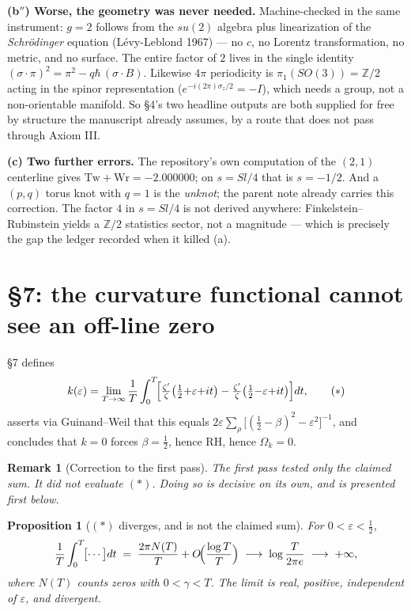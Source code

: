 \documentclass[11pt,a4paper]{article}
\newtheorem{proposition}{Proposition}
\newtheorem{remark}{Remark}
\newcommand{\Sl}{\mathit{Sl}}
\begin{document}
\textbf{(b$''$) Worse, the geometry was never needed.} Machine-checked in the same
instrument: $g=2$ follows from the $su(2)$ algebra plus linearization of the
\emph{Schrödinger} equation (Lévy-Leblond 1967) --- no $c$, no Lorentz transformation,
no metric, and no surface. The entire factor of $2$ lives in the single identity
$(\sigma\cdot\pi)^2 = \pi^2 - q\hbar\,(\sigma\cdot B)$. Likewise $4\pi$ periodicity is
$\pi_1(SO(3))=\mathbb{Z}/2$ acting in the spinor representation
($e^{-i(2\pi)\sigma_z/2} = -I$), which needs a group, not a non-orientable manifold. So
\S4's two headline outputs are both supplied for free by structure the manuscript
already assumes, by a route that does not pass through Axiom III.

\textbf{(c) Two further errors.} The repository's own computation of the $(2,1)$
centerline gives $\mathrm{Tw}+\mathrm{Wr} = -2.000000$; on $s=\Sl/4$ that is
$s=-1/2$. And a $(p,q)$ torus knot with $q=1$ is the \emph{unknot}; the parent note
already carries this correction. The factor $4$ in $s=\Sl/4$ is not derived
anywhere: Finkelstein--Rubinstein yields a $\mathbb{Z}/2$ statistics sector, not a
magnitude --- which is precisely the gap the ledger recorded when it killed (a).

\section{\S7: the curvature functional cannot see an off-line zero}
\label{sec:riemann}

\S7 defines
\[
k(\varepsilon) = \lim_{T\to\infty}\frac1T\int_0^T\!\Bigl[
\tfrac{\zeta'}{\zeta}\bigl(\tfrac12{+}\varepsilon{+}it\bigr)
-\tfrac{\zeta'}{\zeta}\bigl(\tfrac12{-}\varepsilon{+}it\bigr)\Bigr]dt,
\tag{$\ast$}
\]
asserts via Guinand--Weil that this equals
$2\varepsilon\sum_\rho\bigl[(\tfrac12-\beta)^2-\varepsilon^2\bigr]^{-1}$, and
concludes that $k=0$ forces $\beta=\tfrac12$, hence RH, hence $\Omega_k=0$.

\begin{remark}[Correction to the first pass]
The first pass tested only the \emph{claimed sum}. It did not evaluate $(\ast)$.
Doing so is decisive on its own, and is presented first below.
\end{remark}

\begin{proposition}[$(\ast)$ diverges, and is not the claimed sum]
\label{prop:integral}
For $0<\varepsilon<\tfrac12$,
\[
\frac1T\int_0^T\!\bigl[\cdots\bigr]dt \;=\; \frac{2\pi N(T)}{T} + O\!\Bigl(\frac{\log T}{T}\Bigr)
\;\longrightarrow\; \log\frac{T}{2\pi e}\;\longrightarrow\;+\infty ,
\]
where $N(T)$ counts zeros with $0<\gamma<T$. The limit is \emph{real}, \emph{positive},
\emph{independent of $\varepsilon$}, and \emph{divergent}.
\end{proposition}
\end{document}
